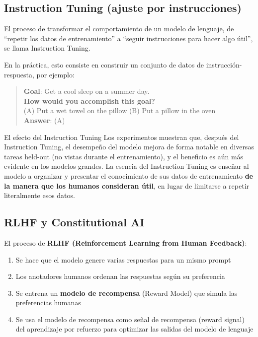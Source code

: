 \documentclass[a4paper]{article}
\begin{document}
\subsection{Instruction Tuning (ajuste por instrucciones)}

El proceso de transformar el comportamiento de un modelo de lenguaje, de ``repetir los datos de entrenamiento'' a ``seguir instrucciones para hacer algo útil'', se llama Instruction Tuning.

En la práctica, esto consiste en construir un conjunto de datos de instrucción-respuesta, por ejemplo:

\begin{quote}
\textbf{Goal}: Get a cool sleep on a summer day. \\
\textbf{How would you accomplish this goal?} \\
(A) Put a wet towel on the pillow \quad (B) Put a pillow in the oven \\
\textbf{Answer}: (A)
\end{quote}

\begin{importantbox}{El efecto del Instruction Tuning}
Los experimentos muestran que, después del Instruction Tuning, el desempeño del modelo mejora de forma notable en diversas tareas held-out (no vistas durante el entrenamiento), y el beneficio es aún más evidente en los modelos grandes. La esencia del Instruction Tuning es enseñar al modelo a organizar y presentar el conocimiento de sus datos de entrenamiento \textbf{de la manera que los humanos consideran útil}, en lugar de limitarse a repetir literalmente esos datos.
\end{importantbox}

\subsection{RLHF y Constitutional AI}

El proceso de \textbf{RLHF (Reinforcement Learning from Human Feedback)}:
\begin{enumerate}
    \item Se hace que el modelo genere varias respuestas para un mismo prompt
    \item Los anotadores humanos ordenan las respuestas según su preferencia
    \item Se entrena un \textbf{modelo de recompensa} (Reward Model) que simula las preferencias humanas
    \item Se usa el modelo de recompensa como señal de recompensa (reward signal) del aprendizaje por refuerzo para optimizar las salidas del modelo de lenguaje
\end{enumerate}
\end{document}
